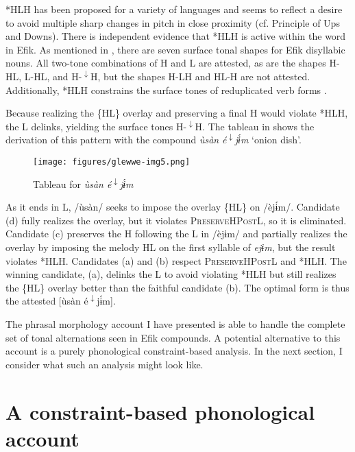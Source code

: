 \documentclass[output=paper]{langscibook}
\begin{document}
*HLH has been proposed for a variety of languages \citep{Cahill2007b,McPherson2016c} and seems to reflect a desire to avoid multiple sharp changes in pitch in close proximity (cf.  Principle of Ups and Downs). There is independent evidence that *HLH is active within the word in Efik. As mentioned in , there are seven surface tonal shapes for Efik disyllabic nouns. All two-tone combinations of H and L are attested, as are the shapes H-HL, L-HL, and H-\textsuperscript{$\downarrow$}H, but the shapes H-LH and HL-H are not attested. Additionally, *HLH constrains the surface tones of reduplicated verb forms \citep{Glewwe2017}.

Because realizing the \{HL\} overlay and preserving a final H would violate *HLH, the L delinks, yielding the surface tones H-\textsuperscript{$\downarrow$}H. The tableau in  shows the derivation of this pattern with the compound \textit{ùsàn} \textit{é\textsuperscript{$\downarrow$}jɨ́m} ‘onion dish’.

  
\begin{figure}
\texttt{[image: figures/glewwe-img5.png]}
\caption{Tableau for \textit{ùsàn é\textsuperscript{$\downarrow$}jɨ́m}}
\label{fig:glewwe:6}
\end{figure}

As it ends in L, /ùsàn/ seeks to impose the overlay \{HL\} on /èjɨ́m/. Candidate (d) fully realizes the overlay, but it violates \textsc{PreserveHPostL}, so it is eliminated. Candidate (c) preserves the H following the L in /èjɨm/ and partially realizes the overlay by imposing the melody HL on the first syllable of \textit{ejɨm}, but the result violates *HLH. Candidates (a) and (b) respect \textsc{PreserveHPostL} and *HLH. The winning candidate, (a), delinks the L to avoid violating *HLH but still realizes the \{HL\} overlay better than the faithful candidate (b). The optimal form is thus the attested [ùsàn é\textsuperscript{$\downarrow$}jɨ́m]. 

The phrasal morphology account I have presented is able to handle the complete set of tonal alternations seen in Efik compounds. A potential alternative to this account is a purely phonological constraint-based analysis. In the next section, I consider what such an analysis might look like. 
 
\section{A constraint-based phonological account}\label{sec:glewwe:3}
\end{document}
